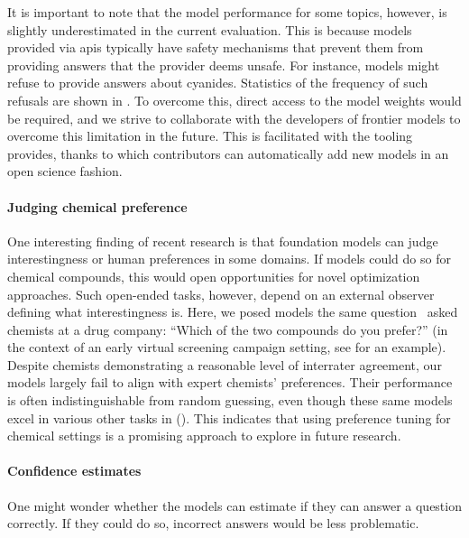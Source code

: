 \documentclass[11pt, oneside]{article}
\begin{document}
\begin{refsection}
It is important to note that the model performance for some topics, however, is slightly underestimated in the current evaluation.
 This is because models provided via \glspl{api} typically have safety mechanisms that prevent them from providing answers that the provider deems unsafe.
 For instance, models might refuse to provide answers about cyanides. Statistics of the frequency of such refusals are shown in .
 To overcome this, direct access to the model weights would be required, and we strive to collaborate with the developers of frontier models to overcome this limitation in the future.
 This is facilitated with the tooling \chembench provides, thanks to which contributors can automatically add new models in an open science fashion.

\paragraph{Judging chemical preference}

One interesting finding of recent research is that foundation models can judge interestingness or human preferences in some domains.\autocite{zhang2024omniopenendednessmodelshuman, Argyle_2023}
If models could do so for chemical compounds, this would open opportunities for novel optimization approaches.
Such open-ended tasks, however, depend on an external observer defining what interestingness is.\autocite{hughes2024openendednessessentialartificialsuperhuman}
Here, we posed models the same question~\textcite{Choung_2023} asked chemists at a drug company: \enquote{Which of the two compounds do you prefer?} (in the context of an early virtual screening campaign setting, see  for an example).
Despite chemists demonstrating a reasonable level of interrater agreement, our models largely fail to align with expert chemists' preferences. Their performance is often indistinguishable from random guessing, even though these same models excel in various other tasks in \chembench ().
This indicates that using preference tuning for chemical settings is a promising approach to explore in future research.


\paragraph{Confidence estimates} One might wonder whether the models can estimate if they can answer a question correctly.
If they could do so, incorrect answers would be less problematic.


\end{refsection}
\end{document}
